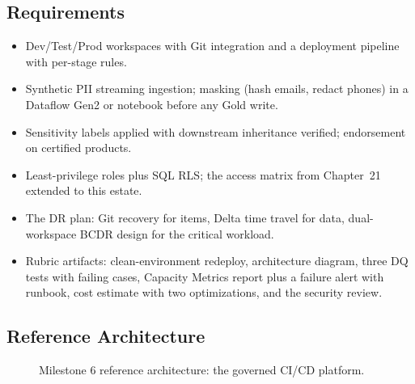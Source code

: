 \subsection*{Requirements}
\begin{itemize}
    \item Dev/Test/Prod workspaces with Git integration and a deployment pipeline with per-stage rules.
    \item Synthetic PII streaming ingestion; masking (hash emails, redact phones) in a Dataflow Gen2 or notebook before any Gold write.
    \item Sensitivity labels applied with downstream inheritance verified; endorsement on certified products.
    \item Least-privilege roles plus SQL RLS; the access matrix from Chapter~21 extended to this estate.
    \item The DR plan: Git recovery for items, Delta time travel for data, dual-workspace BCDR design for the critical workload.
    \item Rubric artifacts: clean-environment redeploy, architecture diagram, three DQ tests with failing cases, Capacity Metrics report plus a failure alert with runbook, cost estimate with two optimizations, and the security review.
\end{itemize}

\subsection*{Reference Architecture}
\begin{figure}[H]
    \centering
    \caption{Milestone 6 reference architecture: the governed CI/CD platform.}
    \label{fig:chapter24-capstone-architecture}
\end{figure}


